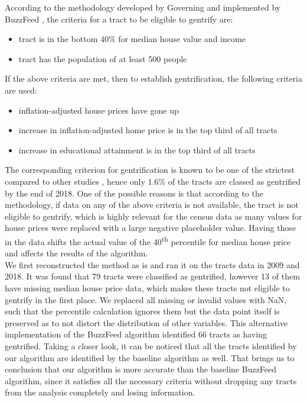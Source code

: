 \documentclass[a4paper, 12pt]{article}
\numberwithin{equation}{section}
\begin{document}
			According to the methodology developed by Governing and implemented by BuzzFeed \cite{BuzzFeed}, the criteria for a tract to be eligible to gentrify are:
				\begin{itemize}
					\item tract is in the bottom 40\% for median house value and income
					\item tract has the population of at least 500 people
				\end{itemize}
			If the above criteria are met, then to establish gentrification, the following criteria are used:
				\begin{itemize}
					\item inflation-adjusted house prices have gone up
					\item increase in inflation-adjusted home price is in the top third of all tracts
					\item increase in educational attainment is in the top third of all tracts
				\end{itemize}
			The corresponding criterion for gentrification is known to be one of the strictest compared to other studies \cite{Bhavsar20}, hence only 1.6\% of the tracts are classed as gentrified by the end of 2018. One of the possible reasons is that according to the methodology, if data on any of the above criteria is not available, the tract is not eligible to gentrify, which is highly relevant for the census data as many values for house prices were replaced with a large negative placeholder value. Having those in the data shifts the actual value of the 40\textsuperscript{th} percentile for median house price and affects the results of the algorithm. \\
			
			We first reconstructed the method as is and ran it on the tracts data in 2009 and 2018. It was found that 79 tracts were classified as gentrified, however 13 of them have missing median house price data, which makes these tracts not eligible to gentrify in the first place. We replaced all missing or invalid values with NaN, such that the percentile calculation ignores them but the data point itself is preserved as to not distort the distribution of other variables. This alternative implementation of the BuzzFeed algorithm identified 66 tracts as having gentrified. Taking a closer look, it can be noticed that all the tracts identified by our algorithm are identified by the baseline algorithm as well. That brings us to conclusion that our algorithm is more accurate than the baseline BuzzFeed algorithm, since it satisfies all the necessary criteria without dropping any tracts from the analysis completely and losing information.
			
\end{document}
